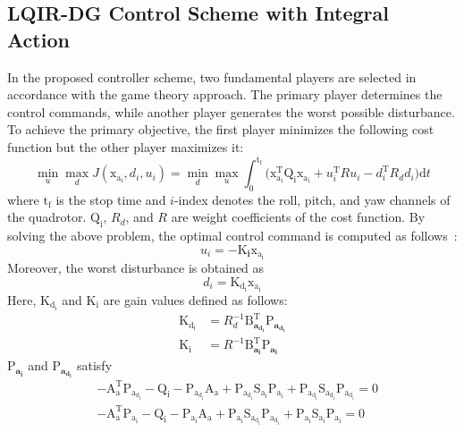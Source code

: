 \documentclass[3p]{elsarticle}
\begin{document}
\subsection{LQIR-DG Control Scheme with Integral Action}
\noindent In the proposed controller scheme, two fundamental players are selected in accordance with the game theory approach. The primary player determines the control commands, while another player generates the worst possible disturbance.
To achieve the primary objective, the first player minimizes the following cost function but the other player maximizes it:
\begin{equation}\label{eq:min_max_cost_function}
    \min_{u} \max_{d} J(\boldsymbol{\mathrm{x_{a_i}}}, {d_i}, {u_i})= \min_{d} \max_{u}
     \int_{0}^{\mathrm{t_f}}\biggl (\boldsymbol{\mathrm{x^\mathrm{T}_{a_i}}}  \boldsymbol{\mathrm{Q_i}} \boldsymbol{\mathrm{x_{a_i}}}+
    {{u^\mathrm{T}_i}}  {{R}} {{u_i}}-
    {{d^\mathrm{T}_{i}}} {{ R_{d} d_{i}}}
    \biggl )\mathrm{d}t
\end{equation}
where $\mathrm{t_f}$ is the stop time and $i$-index denotes the roll, pitch, and yaw channels of the quadrotor. $\boldsymbol{\mathrm{Q_i}}$, ${{R_{d}}}$, and ${{R}}$ are weight coefficients of the cost function.
By solving the above problem, the optimal control command is computed as follows~\cite{LQDG}:
\begin{equation}
    {{u_i}} = -\boldsymbol{{\mathrm{K}}_{i}} \boldsymbol{{\mathrm{x_{a_i}}}}
\end{equation}
Moreover, the worst disturbance is obtained as
\begin{equation}
    {{d_i}} =\boldsymbol{{\mathrm{K_{d_i}}}}\boldsymbol{{\mathrm{x_{a_i}}}}
\end{equation}
Here, $\boldsymbol{{\mathrm{K_{d_i}}}}$ and $\boldsymbol{{\mathrm{K_i}}}$ are gain values defined as follows:
\begin{align}
    \boldsymbol{{\mathrm{K_{d_i}}}} &= {{{R}}^{-1}_{d}}\boldsymbol{{\mathrm{B}_{a_{d_i}}^\mathrm{T}}}\boldsymbol{{\mathrm{P}}_{a_{d_i}}}\\
    \boldsymbol{{\mathrm{K_i}}} &= {{{R}}^{-1}}\boldsymbol{{\mathrm{B}_{a_i}^\mathrm{T}}}\boldsymbol{{\mathrm{P}}_{a_i}}
\end{align}
$\boldsymbol{{\mathrm{P}}_{a_i}}$ and $\boldsymbol{{\mathrm{P}}_{a_{d_i}}}$ satisfy
\begin{align}\label{coupled_riccatti_LQIDG}
    &-\boldsymbol{\mathrm{A^\mathrm{T}_a}}\boldsymbol{\mathrm{P_{a_{d_i}}}}
     - \boldsymbol{\mathrm{Q_{i}}} - \boldsymbol{\mathrm{P_{a_{d_i}}}}\boldsymbol{\mathrm{A_a}} 
     + \boldsymbol{\mathrm{P_{a_{d_i}}}}\boldsymbol{\mathrm{S_{a_i}}}\boldsymbol{\mathrm{P_{a_i}}}
      +\boldsymbol{\mathrm{P_{a_{d_i}}}}\boldsymbol{\mathrm{S_{a_{d_i}}}}\boldsymbol{\mathrm{P_{a_{d_i}}}}
    =\boldsymbol{\mathrm{0}}\\
            &-\boldsymbol{\mathrm{A^\mathrm{T}_a}}\boldsymbol{\mathrm{P_{a_i}}} - \boldsymbol{\mathrm{Q_i}}
             - \boldsymbol{\mathrm{P_{a_i}}}\boldsymbol{\mathrm{A_a}}  +
              \boldsymbol{\mathrm{P_{a_i}}}\boldsymbol{\mathrm{S_{a_{d_i}}}}\boldsymbol{\mathrm{P_{a_{d_i}}}} 
              +\boldsymbol{\mathrm{P_{a_i}}}\boldsymbol{\mathrm{S_{a_i}}}\boldsymbol{\mathrm{P_{a_i}}} =\boldsymbol{\mathrm{0}}
\end{align}
\end{document}
